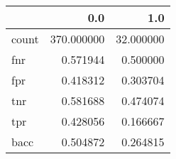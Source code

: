 \begin{tabular}{lrr}
\toprule
{} &         0.0 &        1.0 \\
\midrule
count &  370.000000 &  32.000000 \\
fnr   &    0.571944 &   0.500000 \\
fpr   &    0.418312 &   0.303704 \\
tnr   &    0.581688 &   0.474074 \\
tpr   &    0.428056 &   0.166667 \\
bacc  &    0.504872 &   0.264815 \\
\bottomrule
\end{tabular}
